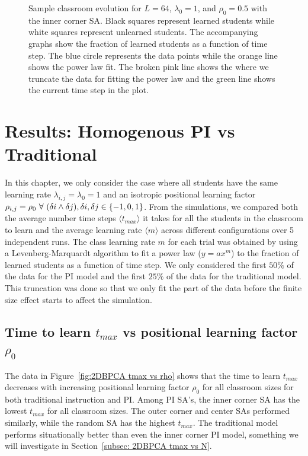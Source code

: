 \begin{figure}[htbp!]
    \caption[Example classroom evolution for the homogenous PI set up]{Sample classroom evolution for $L=64$, $\lambda_0 = 1$, and $\rho_0 = 0.5$ with the inner corner SA. 
    Black squares represent learned students while white squares represent unlearned students. 
    The accompanying graphs show the fraction of learned students as a function of time step. 
    The blue circle represents the data points while the orange line shows the power law fit. 
    The broken pink line shows the where we truncate the data for fitting the power law and the green line shows the current time step in the plot.}
    \label{fig:Sample classroom evolution}
 \end{figure}

\section{Results: Homogenous PI vs Traditional}
In this chapter, we only consider the case where all students have the same learning rate $\lambda_{i,j} = \lambda_0 = 1$ and an isotropic positional learning factor $\rho_{i,j} = \rho_0 \space ~\forall~ (\delta i \land \delta j),  \delta i, \delta j \in \lbrace -1,0,1 \rbrace $. 
From the simulations, we compared both the average number time steps $\langle t_{max} \rangle$ it takes for all the students in the classroom to learn and the average learning rate $\langle m \rangle$ across different configurations over 5 independent runs.
 The class learning rate $m$ for each trial was obtained by using a Levenberg-Marquardt algorithm to fit a power law ($y = ax^m$) to the fraction of learned students as a function of time step. 
 We only considered the first $50\%$ of the data for the PI model and the first $25\%$ of the data for the traditional model. 
This truncation was done so that we only fit the part of the data before the finite size effect starts to affect the simulation.

\subsection{Time to learn $t_{max}$ vs positional learning factor $\rho_0$} \label{subsec: 2DBPCA tmax vs rho}

The data in Figure~\ref{fig:2DBPCA tmax vs rho} shows that the time to learn $t_{max}$ decreases with increasing positional learning factor $\rho_0$ for all classroom sizes for both traditional instruction and PI. 
Among PI SA's, the inner corner SA has the lowest $t_{max}$ for all classroom sizes. 
The outer corner and center SAs performed similarly, while the random SA has the highest $t_{max}$. 
The traditional model performs situationally better than even the inner corner PI model, something we will investigate in Section~\ref{subsec: 2DBPCA tmax vs N}.

